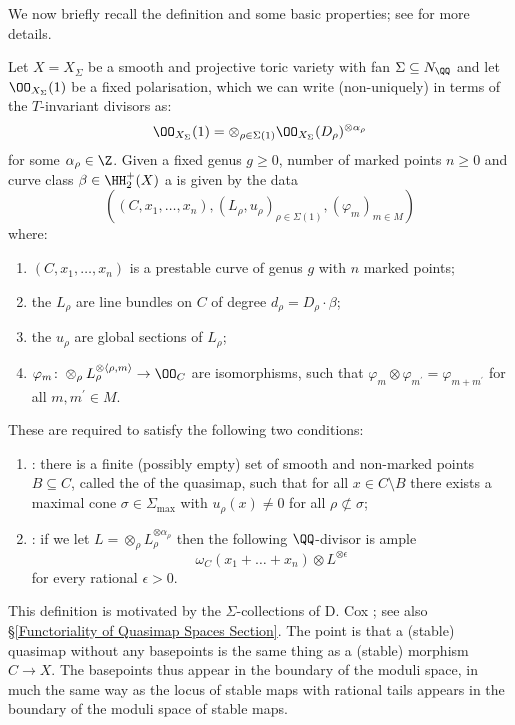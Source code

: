 We now briefly recall the definition and some basic properties; see \cite{CF-K} for more details.
\begin{definition}[{\cite[Definition 3.1.1]{CF-K}}] Let $X= X_{\Sigma}$ be a smooth and projective toric variety with fan $\Sigma \subseteq N_{\QQ}$ and let $\OO_{X_\Sigma}(1)$ be a fixed polarisation, which we can write (non-uniquely) in terms of the $T$-invariant divisors as:
\begin{equation*} \OO_{X_\Sigma}(1) = \otimes_{\rho \in \Sigma(1)} \OO_{X_\Sigma}(D_\rho)^{\otimes \alpha_\rho} \end{equation*}
for some $\alpha_\rho \in \Z$. Given a fixed genus $g \geq 0$, number of marked points $n \geq 0$ and curve class $\beta \in \HH_2^+(X)$ a  is given by the data
\begin{equation*} ((C,x_1,\ldots,x_n), (L_\rho,u_\rho)_{\rho \in \Sigma(1)}, (\varphi_m)_{m \in M}) \end{equation*}
where:
\begin{enumerate}
\item $(C,x_1,\ldots,x_n)$ is a prestable curve of genus $g$ with $n$ marked points;
\item the $L_\rho$ are line bundles on $C$ of degree $d_\rho = D_\rho \cdot \beta$;
\item the $u_\rho$ are global sections of $L_\rho$;
\item $\varphi_m \colon \otimes_\rho L_\rho^{\otimes \langle \rho, m \rangle} \to \OO_C$ are isomorphisms, such that $\varphi_{m} \otimes \varphi_{m^\prime} = \varphi_{m + m^\prime}$ for all $m, m^\prime \in M$.
\end{enumerate}
These are required to satisfy the following two conditions:
\begin{enumerate}
\item {}: there is a finite (possibly empty) set of smooth and non-marked points $B \subseteq C$, called the  of the quasimap, such that for all $x \in C \setminus B$ there exists a maximal cone $\sigma \in \Sigma_{\operatorname{max}}$ with $u_\rho(x) \neq 0$ for all $\rho \not\subset \sigma$;
\item {}: if we let $L = \otimes_\rho L_\rho^{\otimes \alpha_\rho}$ then the following $\QQ$-divisor is ample
\begin{equation*} \omega_C(x_1 + \ldots + x_n)\otimes L^{\otimes \epsilon} \end{equation*}
for every rational $\epsilon > 0$.
\end{enumerate}
\end{definition}
\begin{remark} This definition is motivated by the $\Sigma$-collections of D. Cox \cite{CoxFunctor}; see also \S \ref{Functoriality of Quasimap Spaces Section}. The point is that a (stable) quasimap without any basepoints is the same thing as a (stable) morphism $C \to X$. The basepoints thus appear in the boundary of the moduli space, in much the same way as the locus of stable maps with rational tails appears in the boundary of the moduli space of stable maps. \end{remark}

